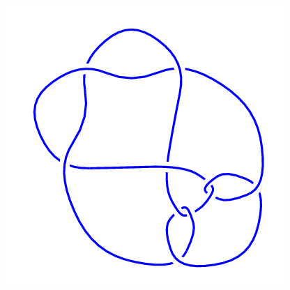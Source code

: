 \begin{figure}[H]
\begin{minipage}[b]{.18\linewidth}
    \end{minipage}
    \begin{minipage}[b]{.18\linewidth}
        \centering
        \includegraphics[width=\linewidth]{../data/10_66.png}
    \end{minipage}
\end{figure}

